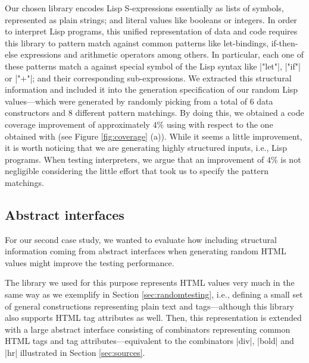 Our chosen library encodes Lisp S-expressions essentially as lists of symbols,
represented as plain strings; and literal values like booleans or integers.
%
In order to interpret Lisp programs, this unified representation of data and
code requires this library to pattern match against common patterns like
let-bindings, if-then-else expressions and arithmetic operators among others.
%
In particular, each one of these patterns match a against special symbol of the
Lisp syntax like |"let"|, |"if"| or |"+"|; and their corresponding
sub-expressions.
%
We extracted this structural information and included it into the generation
specification of our random Lisp values---which were generated by randomly
picking from a total of 6 data constructors and 8 different pattern matchings.
%
By doing this, we obtained a code coverage improvement of approximately $4\%$
using \dragenp with respect to the one obtained with \dragen (see Figure
\ref{fig:coverage} (a)).
%
While it seems a little improvement, it is worth noticing that we are generating
highly structured inputs, i.e., Lisp programs.
%
When testing interpreters, we argue that an improvement of $4\%$ is not
negligible considering the little effort that took us to specify the pattern
matchings.

\subsection{Abstract interfaces}


For our second case study, we wanted to evaluate how including structural
information coming from abstract interfaces when generating random HTML values
might improve the testing performance.


The library we used for this purpose represents HTML values very much in the
same way as we exemplify in Section \ref{sec:randomtesting}, i.e., defining a
small set of general constructions representing plain text and tags---although
this library also supports HTML tag attributes as well.
%
Then, this representation is extended with a large abstract interface consisting
of combinators representing common HTML tags and tag attributes---equivalent to
the combinators |div|, |bold| and |hr| illustrated in Section \ref{sec:sources}.


